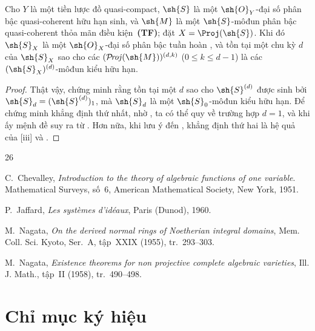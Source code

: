 \documentclass[oneside,10pt]{amsart}
\renewcommand{\leq}{\leqslant}
\def\shProj{\mathcal{P}\!\mathit{roj}}
\newcommand{\oldpage}[2][]{\marginnote{\normalfont\footnotesize\textbf{#1}~|~#2}\ignorespaces}
\let\EGAOriginalLabel\label
\renewcommand{\label}[1]{\phantomsection\EGAOriginalLabel{#1}}
\begin{document}
\begin{proposition}[8.14.14]
\label{II.8.14.14}
Cho $Y$ là một tiền lược đồ quasi-compact, $\sh{S}$ là một $\sh{O}_Y$-đại số phân bậc quasi-coherent hữu hạn sinh, và $\sh{M}$ là một $\sh{S}$-môđun phân bậc quasi-coherent thỏa mãn điều kiện~\textbf{(TF)};
đặt $X=\Proj(\sh{S})$.
Khi đó $\sh{S}_X$ là một $\sh{O}_X$-đại số phân bậc tuần hoàn , và tồn tại một
\oldpage[II]{203}
chu kỳ $d$ của $\sh{S}_X$ sao cho các $(\shProj(\sh{M}))^{(d,k)}$ ($0\leq k\leq d-1$) là các $(\sh{S}_X)^{(d)}$-môđun kiểu hữu hạn.
\end{proposition}

\begin{proof}
Thật vậy,  chứng minh rằng tồn tại một $d$ sao cho $\sh{S}^{(d)}$ được sinh bởi $\sh{S}_d=(\sh{S}^{(d)})_1$, mà $\sh{S}_d$ là một $\sh{S}_0$-môđun kiểu hữu hạn.
Để chứng minh khẳng định thứ nhất, nhờ , ta có thể quy về trường hợp $d=1$, và khi ấy mệnh đề suy ra từ .
Hơn nữa, khi lưu ý đến , khẳng định thứ hai là hệ quả của [iii] và .
\end{proof}
\clearpage
\thispagestyle{empty}
\null
\clearpage
\oldpage[II]{205}
{}
\renewcommand{\refname}{Tài liệu tham khảo \textit{(tiếp)}}

\begin{thebibliography}{26}

C.~Chevalley,
\emph{Introduction to the theory of algebraic functions of one variable}.
Mathematical Surveys, số~6, American Mathematical Society, New York, 1951.

P.~Jaffard,
\emph{Les systèmes d'idéaux}, Paris (Dunod), 1960.

M.~Nagata,
\emph{On the derived normal rings of Noetherian integral domains},
Mem. Coll. Sci. Kyoto, Ser.~A, tập~XXIX (1955), tr.~293--303.

M.~Nagata,
\emph{Existence theorems for non projective complete algebraic varieties},
Ill. J. Math., tập~II (1958), tr.~490--498.

\end{thebibliography}
\clearpage
\oldpage[II]{206}
\clearpage
\oldpage[II]{207}
{}
\section*{Chỉ mục ký hiệu}
\end{document}
